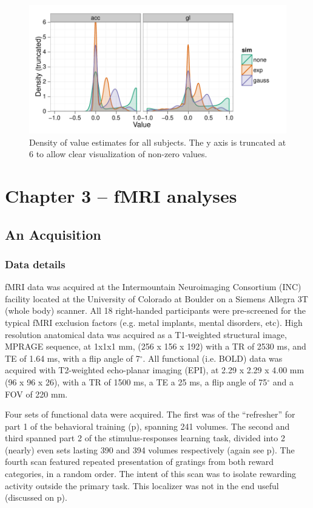 \documentclass[doc,12pt]{apa}        %
\begin{document}
\begin{figure}[tp]
	\includegraphics{f_density_value}
    \centering
    \caption{Density of value estimates for all subjects.  The y axis is truncated at 6 to allow clear visualization of non-zero values.}
	\label{fig:denvalue}
\end{figure}

\clearpage
\section{Chapter 3 -- fMRI analyses} %
\label{sec:task_and_models}
\subsection{An Acquisition}
\label{sub:acquired}
\subsubsection{Data details}
\label{subsub:datadetails}
fMRI data was acquired at the Intermountain Neuroimaging Consortium (INC) facility located at the University of Colorado at Boulder on a Siemens Allegra 3T (whole body) scanner.  All 18 right-handed participants were pre-screened for the typical fMRI exclusion factors (e.g. metal implants, mental disorders, etc).  High resolution anatomical data was acquired as a T1-weighted structural image, MPRAGE sequence, at 1x1x1 mm, (256 x 156 x 192) with a TR of 2530 ms, and TE of 1.64 ms, with a flip angle of 7$^\circ$.  All functional (i.e. BOLD) data was acquired with T2-weighted echo-planar imaging (EPI), at 2.29 x 2.29 x 4.00 mm (96 x 96 x 26), with a TR of 1500 ms, a TE a 25 ms, a flip angle of 75$^\circ$ and a FOV of 220 mm.

Four sets of functional data were acquired.  The first was of the ``refresher'' for part 1 of the behavioral training (p\pageref{subsub:whatwhen}), spanning 241 volumes.  The second and third spanned part 2 of the stimulus-responses learning task, divided into 2 (nearly) even sets lasting 390 and 394 volumes respectively (again see p\pageref{subsub:whatwhen}).  The fourth scan featured repeated presentation of gratings from both reward categories, in a random order.  The intent of this scan was to isolate rewarding activity outside the primary task. This localizer was not in the end useful (discussed on p\pageref{subsub:chunks}).
\end{document}
